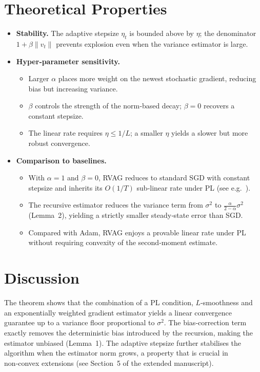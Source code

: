 \documentclass{article}
\begin{document}
\section*{Theoretical Properties}
\begin{itemize}
\item \textbf{Stability.} The adaptive stepsize $\eta_{t}$ is bounded above by $\eta$; the denominator $1+\beta\|\widehat v_{t}\|$ prevents explosion even when the variance estimator is large.
\item \textbf{Hyper‑parameter sensitivity.} 
\begin{itemize}
\item Larger $\alpha$ places more weight on the newest stochastic gradient, reducing bias but increasing variance.
\item $\beta$ controls the strength of the norm‑based decay; $\beta=0$ recovers a constant stepsize.
\item The linear rate requires $\eta\le 1/L$; a smaller $\eta$ yields a slower but more robust convergence.
\end{itemize}
\item \textbf{Comparison to baselines.}
\begin{itemize}
\item With $\alpha=1$ and $\beta=0$, RVAG reduces to standard SGD with constant stepsize and inherits its $O(1/T)$ sub‑linear rate under PL (see e.g.~\cite{karimi2016linear}).
\item The recursive estimator reduces the variance term from $\sigma^{2}$ to $\frac{\alpha}{2-\alpha}\sigma^{2}$ (Lemma~2), yielding a strictly smaller steady‑state error than SGD.
\item Compared with Adam, RVAG enjoys a provable linear rate under PL without requiring convexity of the second‑moment estimate.
\end{itemize}
\end{itemize}

\section*{Discussion}
The theorem shows that the combination of a PL condition, $L$‑smoothness and an exponentially weighted gradient estimator yields a linear convergence guarantee up to a variance floor proportional to $\sigma^{2}$. The bias‑correction term exactly removes the deterministic bias introduced by the recursion, making the estimator unbiased (Lemma~1). The adaptive stepsize further stabilises the algorithm when the estimator norm grows, a property that is crucial in non‑convex extensions (see Section~5 of the extended manuscript).
\end{document}
